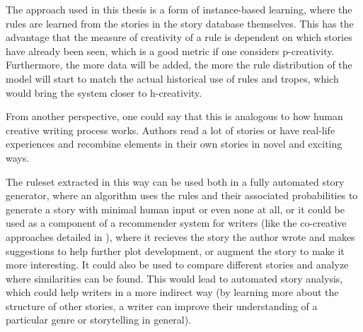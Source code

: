 The approach used in this thesis is a form of instance-based learning, where the
rules are learned from the stories in the story database themselves. This has the advantage that
the measure of creativity of a rule is dependent on which stories have already been seen,
which is a good metric if one considers p-creativity. Furthermore, the more data
will be added, the more the rule distribution of the model will start to match 
the actual historical use of rules and tropes, which would bring the system closer to
h-creativity.

From another perspective, one could say that this is analogous to how human
creative writing process works. Authors read a lot of stories or have real-life
experiences and recombine elements in their own stories in novel and exciting ways.

The ruleset extracted in this way can be used both in a fully automated story
generator, where an algorithm uses the rules and their associated probabilities
to generate a story with minimal human input or even none at all, or it could be used as a component
of a recommender system for writers (like the co-creative approaches detailed in
\cite{kantosalo2014isolation}), where it recieves the story the author
wrote and makes suggestions to help further plot development, or augment the
story to make it more interesting. It could also be used to compare different
stories and analyze where similarities can be found. This would lead to
automated story analysis, which could help writers in a more indirect way (by
learning more about the structure of other stories, a writer can improve their
understanding of a particular genre or storytelling in general).

